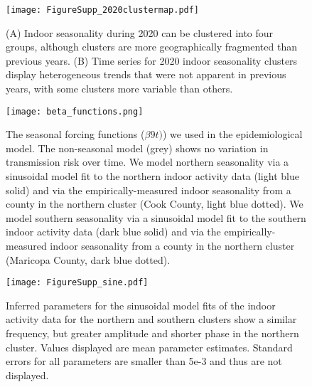 \documentclass{article}
\begin{document}
\begin{figure}[h!]
    \centering
    \texttt{[image: FigureSupp\_2020clustermap.pdf]}
    \caption{(A) Indoor seasonality during 2020 can be clustered into four groups, although clusters are more geographically fragmented than previous years. (B) Time series for 2020 indoor seasonality clusters display heterogeneous trends that were not apparent in previous years, with some clusters more variable than others.}
    \label{fig:2020clustermap}
\end{figure}

\begin{figure}[h!]
    \centering
    \texttt{[image: beta\_functions.png]}
    \caption{The seasonal forcing functions ($\beta9t)$) we used in the epidemiological model. The non-seasonal model (grey) shows no variation in transmission risk over time. We model northern seasonality via a sinusoidal model fit to the northern indoor activity data (light blue solid) and via the empirically-measured indoor seasonality from a county in the northern cluster (Cook County, light blue dotted). We model southern seasonality via a sinusoidal model fit to the southern indoor activity data (dark blue solid) and via the empirically-measured indoor seasonality from a county in the northern cluster (Maricopa County, dark blue dotted).}
    \label{fig:betafunction}
\end{figure}

\begin{figure}[h!]
    \centering
    \texttt{[image: FigureSupp\_sine.pdf]}
    \caption{Inferred parameters for the sinusoidal model fits of the indoor activity data for the northern and southern clusters show a similar frequency, but greater amplitude and shorter phase in the northern cluster. Values displayed are mean parameter estimates. Standard errors for all parameters are smaller than 5e-3 and thus are not displayed.}
    \label{fig:sineparamters}
\end{figure}

\end{document}
